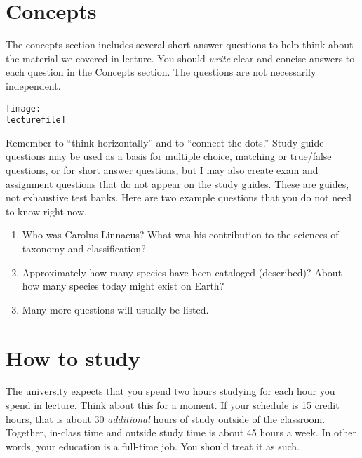 \documentclass[letterpaper]{tufte-handout}
\newcommand\lecturefile{163_lecture00}
\begin{document}
\section{Concepts}

The concepts section includes several short-answer questions to help think about the material we covered in lecture. You should \emph{write} clear and concise answers to each question in the Concepts section.  The questions are not necessarily independent.  
\begin{marginfigure}
	\texttt{[image: \\lecturefile]}
\end{marginfigure}


Remember to “think horizontally” and to “connect the dots.”  Study guide questions may be used as a basis for multiple choice, matching or true/false questions, or for short answer questions, but I may also create exam and assignment questions that do not appear on the study guides.  These are guides, not exhaustive test banks. Here are two example questions that you do not need to know right now.


\begin{enumerate}
	\item Who was Carolus Linnaeus? What was his contribution to the sciences of taxonomy and classification?

	\item Approximately how many species have been cataloged (described)? About how many species today might exist on Earth?
	
	\item Many more questions will usually be listed.
	
\end{enumerate}

\section{How to study}

The university expects that you spend two hours studying for each hour you spend in lecture. Think about this for a moment. If your schedule is 15 credit hours, that is about 30 \emph{additional} hours of study outside of the classroom. Together, in-class time and outside study time is about 45 hours a week. In other words, your education is a full-time job.  You should treat it as such.
\end{document}
